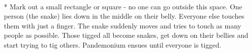 \begin{minipage}{\textwidth}
\equip{}
\\*
Mark out a small rectangle or square - no one can go outside this space. One person (the snake) lies down in the middle on their belly. Everyone else touches them with just a finger. The snake suddenly moves and tries to touch as many people as possible. Those tigged all become snakes, get down on their bellies and start trying to tig others. Pandemonium ensues until everyone is tigged.
\end{minipage}    \vfill
